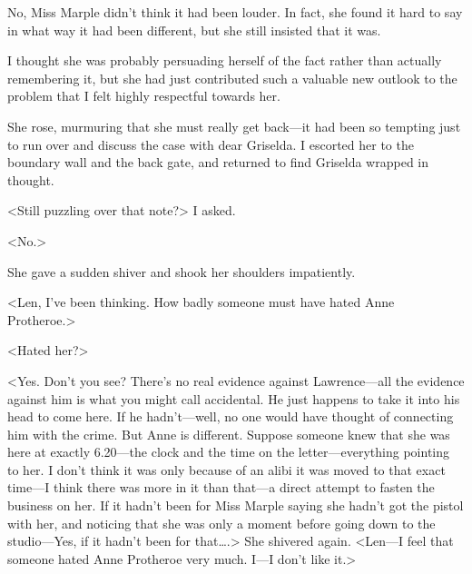 No, Miss Marple didn't think it had been louder. In fact, she found it hard to say in what way it had been different, but she still insisted that it was.

I thought she was probably persuading herself of the fact rather than actually remembering it, but she had just contributed such a valuable new outlook to the problem that I felt highly respectful towards her.

She rose, murmuring that she must really get back—it had been so tempting just to run over and discuss the case with dear Griselda. I escorted her to the boundary wall and the back gate, and returned to find Griselda wrapped in thought.

<Still puzzling over that note?> I asked.

<No.>

She gave a sudden shiver and shook her shoulders impatiently.

<Len, I've been thinking. How badly someone must have hated Anne Protheroe.>

<Hated her?>

<Yes. Don't you see? There's no real evidence against Lawrence—all the evidence against him is what you might call accidental. He just happens to take it into his head to come here. If he hadn't—well, no one would have thought of connecting him with the crime. But Anne is different. Suppose someone knew that she was here at exactly 6.20—the clock and the time on the letter—everything pointing to her. I don't think it was only because of an alibi it was moved to that exact time—I think there was more in it than that—a direct attempt to fasten the business on her. If it hadn't been for Miss Marple saying she hadn't got the pistol with her, and noticing that she was only a moment before going down to the studio—Yes, if it hadn't been for that\dots.> She shivered again. <Len—I feel that someone hated Anne Protheroe very much. I—I don't like it.>